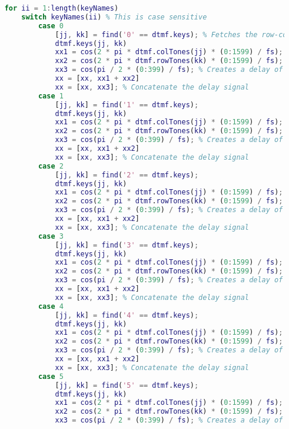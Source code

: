 \begin{lstlisting}[language=Matlab]
    % --- START THE FOR LOOP --- %
    for ii = 1:length(keyNames)
        switch keyNames(ii) % This is case sensitive
            case 0
                [jj, kk] = find('0' == dtmf.keys); % Fetches the row-column indices
                dtmf.keys(jj, kk)
                xx1 = cos(2 * pi * dtmf.colTones(jj) * (0:1599) / fs); % First signal
                xx2 = cos(2 * pi * dtmf.rowTones(kk) * (0:1599) / fs); % Second Signal
                xx3 = cos(pi / 2 * (0:399) / fs); % Creates a delay of 0.05 secs
                xx = [xx, xx1 + xx2]
                xx = [xx, xx3]; % Concatenate the delay signal
            case 1
                [jj, kk] = find('1' == dtmf.keys);
                dtmf.keys(jj, kk)
                xx1 = cos(2 * pi * dtmf.colTones(jj) * (0:1599) / fs);
                xx2 = cos(2 * pi * dtmf.rowTones(kk) * (0:1599) / fs);
                xx3 = cos(pi / 2 * (0:399) / fs); % Creates a delay of 0.05 secs
                xx = [xx, xx1 + xx2]
                xx = [xx, xx3]; % Concatenate the delay signal
            case 2
                [jj, kk] = find('2' == dtmf.keys);
                dtmf.keys(jj, kk)
                xx1 = cos(2 * pi * dtmf.colTones(jj) * (0:1599) / fs);
                xx2 = cos(2 * pi * dtmf.rowTones(kk) * (0:1599) / fs);
                xx3 = cos(pi / 2 * (0:399) / fs); % Creates a delay of 0.05 secs
                xx = [xx, xx1 + xx2]
                xx = [xx, xx3]; % Concatenate the delay signal
            case 3
                [jj, kk] = find('3' == dtmf.keys);
                dtmf.keys(jj, kk)
                xx1 = cos(2 * pi * dtmf.colTones(jj) * (0:1599) / fs);
                xx2 = cos(2 * pi * dtmf.rowTones(kk) * (0:1599) / fs);
                xx3 = cos(pi / 2 * (0:399) / fs); % Creates a delay of 0.05 secs
                xx = [xx, xx1 + xx2]
                xx = [xx, xx3]; % Concatenate the delay signal
            case 4
                [jj, kk] = find('4' == dtmf.keys);
                dtmf.keys(jj, kk)
                xx1 = cos(2 * pi * dtmf.colTones(jj) * (0:1599) / fs);
                xx2 = cos(2 * pi * dtmf.rowTones(kk) * (0:1599) / fs);
                xx3 = cos(pi / 2 * (0:399) / fs); % Creates a delay of 0.05 secs
                xx = [xx, xx1 + xx2]
                xx = [xx, xx3]; % Concatenate the delay signal
            case 5
                [jj, kk] = find('5' == dtmf.keys);
                dtmf.keys(jj, kk)
                xx1 = cos(2 * pi * dtmf.colTones(jj) * (0:1599) / fs);
                xx2 = cos(2 * pi * dtmf.rowTones(kk) * (0:1599) / fs);
                xx3 = cos(pi / 2 * (0:399) / fs); % Creates a delay of 0.05 secs

\end{lstlisting}
